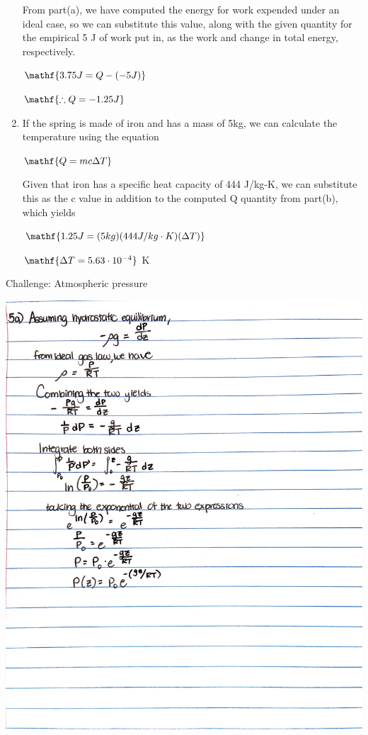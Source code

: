 \documentclass{homework}
\begin{document}
\begin{enumerate}[label={(\alph*)}]
\begin{center}
    \end{center}
    From part(a), we have computed the energy for work expended under an ideal case, so we can substitute this value, along with the given quantity for the empirical 5 J of work put in, as the work and change in total energy, respectively.
    \begin{center}
        $\mathf{3.75 J = Q - (- 5 J)}$
    \end{center}
    \begin{center}
        $\mathf{\therefore Q = -1.25 J}$
    \end{center}
    \item If the spring is made of iron and has a mass of 5kg, we can calculate the temperature using the equation 
    \begin{center}
         $\mathf{Q = mc\Delta T}$
    \end{center}
    
        Given that iron has a specific heat capacity of 444 J/kg-K, we can substitute this as the c value in addition to the computed Q quantity from part(b), which yields
    \begin{center}
         $\mathf{1.25 J = (5 kg)(444 J/kg\cdot K)(\Delta T)}$
    \end{center}
    \begin{center}
        $\mathf{\Delta T = 5.63 \cdot 10^{-4}}$ K
    \end{center}



\end{enumerate}
\question Challenge: Atmospheric pressure
\begin{center}
    \includegraphics[width=15cm]{media/5a.JPG}
\end{center}
\end{document}
